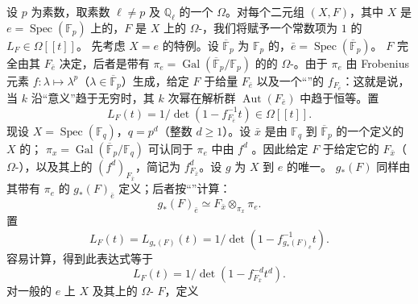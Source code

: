 设 $p$ 为素数，取素数 $\ell\ne p$ 及 $\mathbb Q_\ell$ 的一个 $\Omega$。对每个二元组 $(X,F)$，其中 $X$ 是 $e=\operatorname{Spec}(\mathbb F_p)$ 上的，$F$ 是 $X$ 上的 $\Omega$-，我们将赋予一个常数项为 $1$ 的 $L_F\in\Omega[[t]]$。
先考虑 $X=e$ 的特例。设 $\overline{\mathbb F}_p$ 为 $\mathbb F_p$ 的，$\bar e=\operatorname{Spec}(\overline{\mathbb F}_p)$。 $F$ 完全由其 $F_{\bar e}$ 决定，后者是带有 $\pi_e=\operatorname{Gal}(\overline{\mathbb F}_p/\mathbb F_p)$ 的的 $\Omega$-。由于 $\pi_e$ 由 Frobenius 元素 $f:\lambda\mapsto\lambda^p$（$\lambda\in\overline{\mathbb F}_p$）生成，给定 $F$ 于给量 $F_{\bar e}$ 以及一个“”的 $f_{F_{\bar e}}$：这就是说，当 $k$ 沿“意义”趋于无穷时，其 $k$ 次幂在解析群 $\operatorname{Aut}(F_{\bar e})$ 中趋于恒等。置
\[
L_F(t)=1/\det(1-f_{F_{\bar e}}^{-1}t)\in\Omega[[t]].
\]
现设 $X=\operatorname{Spec}(\mathbb F_q)$，$q=p^d$（整数 $d\geq1$）。设 $\bar x$ 是由 $\mathbb F_q$ 到 $\overline{\mathbb F}_p$ 的一个定义的 $X$ 的； $\pi_x=\operatorname{Gal}(\overline{\mathbb F}_p/\mathbb F_q)$ 可认同于 $\pi_e$ 中由 $f^d$ 。因此给定 $F$ 于给定它的 $F_{\bar x}$（ $\Omega$-），以及其上的 $(f^d)_{F_{\bar x}}$，简记为 $f_{F_{\bar x}}^d$。设 $g$ 为 $X$ 到 $e$ 的唯一。 $g_*(F)$ 同样由其带有 $\pi_e$ 的 $g_*(F)_{\bar e}$ 定义；后者按“”计算：
\[
g_*(F)_{\bar e}\simeq F_{\bar x}\otimes_{\pi_x}\pi_e.
\]
置
\[
L_F(t)=L_{g_*(F)}(t)=1/\det(1-f_{g_*(F)_{\bar e}}^{-1}t).
\]
容易计算，得到此表达式等于
\[
L_F(t)=1/\det(1-f_{F_{\bar x}}^{-d}t^d).
\]
对一般的 $e$ 上 $X$ 及其上的 $\Omega$- $F$，定义
